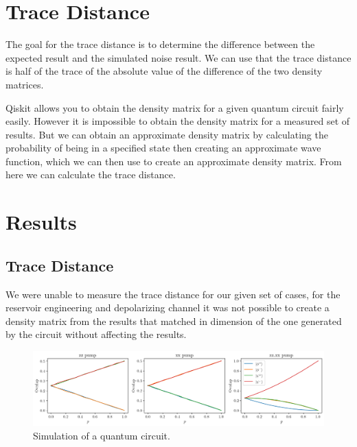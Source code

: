 \documentclass[12pt]{article}
\begin{document}
  \section{Trace Distance}

  The goal for the trace distance is to determine the difference between the expected result and the simulated noise result. We can use that the trace distance is half of the trace of the absolute value of the difference of the two density matrices. %

  Qiskit allows you to obtain the density matrix for a given quantum circuit fairly easily. However it is impossible to obtain the density matrix for a measured set of results. But we can obtain an approximate density matrix by calculating the probability of being in a specified state then creating an approximate wave function, which we can then use to create an approximate density matrix. From here we can calculate the trace distance.


  \section{Results}

  \subsection{Trace Distance}

  We were unable to measure the trace distance for our given set of cases, for the reservoir engineering and depolarizing channel it was not possible to create a density matrix from the results that matched in dimension of the one generated by the circuit without affecting the results.

  \begin{figure}
    \centering
    \includegraphics[width=\textwidth]{images/reservoir-engineering-simulation.png}
    \caption{Simulation of a quantum circuit.%
      \label{fig:reservoir-engineering-simulation}}
  \end{figure}
\end{document}
